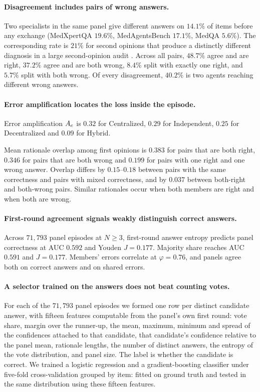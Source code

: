 \paragraph{Disagreement includes pairs of wrong answers.}
Two specialists in the same panel give different answers on $14.1\%$ of items before any exchange
(MedXpertQA $19.6\%$, MedAgentsBench $17.1\%$, MedQA $5.6\%$). The corresponding rate is $21\%$ for
second opinions that produce a distinctly different diagnosis in a large second-opinion audit
\citep{vansuch2017}. Across
all pairs, $48.7\%$ agree and are right, $37.2\%$ agree and are both wrong,
$8.4\%$ split with exactly one right, and $5.7\%$ split with both wrong. Of every disagreement,
$40.2\%$ is two agents reaching different wrong answers.

\paragraph{Error amplification locates the loss inside the episode.}
Error amplification $A_{e}$ is $0.32$ for Centralized, $0.29$ for Independent,
$0.25$ for Decentralized and $0.09$ for Hybrid.

Mean rationale overlap among first opinions is
$0.383$ for pairs that are both right, $0.346$ for pairs that are both wrong and $0.199$ for pairs
with one right and one wrong answer. Overlap differs by $0.15$--$0.18$ between pairs with the
same correctness and pairs with mixed correctness, and by $0.037$ between both-right and
both-wrong pairs. Similar rationales occur when both members are right and when both are wrong.



\paragraph{First-round agreement signals weakly distinguish correct answers.}
Across $71{,}793$ panel episodes at $N \geq 3$, first-round answer entropy predicts panel
correctness at AUC $0.592$ and Youden $J = 0.177$. Majority share reaches AUC $0.591$ and
$J = 0.177$. Members' errors correlate at $\varphi = 0.76$, and panels agree both on correct
answers and on shared errors.

\paragraph{A selector trained on the answers does not beat counting votes.}
For each of the $71{,}793$ panel
episodes we formed one row per distinct candidate answer, with fifteen features computable from
the panel's own first round: vote share, margin over the runner-up, the mean, maximum, minimum and
spread of the confidences attached to that candidate, that candidate's confidence relative to the
panel mean, rationale lengths, the number of distinct answers, the entropy of the vote
distribution, and panel size. The label is whether the candidate is correct. We trained a logistic
regression and a gradient-boosting classifier under five-fold cross-validation grouped by item:
fitted on ground truth and tested in the same distribution using these fifteen features.

